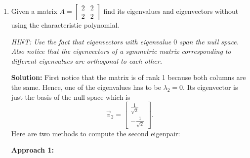 \documentclass[10pt]{article}
\begin{document}
\begin{enumerate}[label=(\alph*)]
    \textbf{Solution:} Say $\lambda \neq 0$, $\vec{v}$ is an eigenpair of $A^\top A$ which is a $n \times n$ matrix. Hence,
    \begin{equation}
        (A^\top A)\vec{v} = \lambda\vec{v}
    \end{equation}
    Multiply both sides with $A$, to get,
    \begin{align}
        A(A^\top A)\vec{v} &= A(\lambda\vec{v}) \\
        (AA^\top)A\vec{v} &= \lambda A\vec{v}
    \end{align}
    As $\lambda \neq 0$ and $\vec{v} \neq \vec{0}_n$, we have $\lambda\vec{v} \neq \vec{0}_n$ and so, $(A^\top A)\vec{v} \neq \vec{0}_n$. Thus $A^\top(A\vec{v}) \neq \vec{0}_n$, which implies that $A\vec{v} \neq \vec{0}_d$. Therefore, $A\vec{v}$ is an eigenvector of $AA^\top$ corresponding to $\lambda$. Similarly, we can show that every non-zero eigenvalue of $AA^\top$ is an eigenvalue of $A^\top A$ and we are done.

    \item Given a matrix $A = \begin{bmatrix} 2 & 2 \\ 2 & 2 \end{bmatrix}$ find its eigenvalues and eigenvectors without using the characteristic polynomial.

    \textit{HINT: Use the fact that eigenvectors with eigenvalue $0$ span the null space. Also notice that the eigenvectors of a symmetric matrix corresponding to different eigenvalues are orthogonal to each other.}

    \textbf{Solution:} First notice that the matrix is of rank 1 because both columns are the same. Hence, one of the eigenvalues has to be $\lambda_2 = 0$. Its eigenvector is just the basis of the null space which is
    \begin{equation}
        \vec{v}_2 = \begin{bmatrix} \frac{1}{\sqrt{2}} \\ -\frac{1}{\sqrt{2}} \end{bmatrix}.
    \end{equation}
    Here are two methods to compute the second eigenpair:

    \textbf{Approach 1:}


\end{enumerate}
\end{document}
